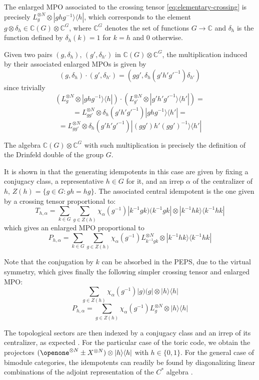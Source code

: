 \documentclass[rmp,aps,reprint,superscriptaddress,nobalancelastpage]{revtex4-1}
\def\Id{{\openone}}
\begin{document}
The enlarged MPO associated to the crossing tensor \eqref{eq:elementary-crossing} is precisely $L_g^{\otimes N}\otimes |ghg^{-1}\rangle\langle h|$, which corresponds to the element $g\otimes \delta_h \in \mathbb{C}(G)\otimes \mathbb{C}^G$, where $\mathbb{C}^G$ denotes the set of functions $G\rightarrow \mathbb{C}$ and $\delta_h$ is the function defined by $\delta_h(k)=1$ for $k=h$ and $0$ otherwise.

Given two pairs $(g,\delta_h)$, $(g',\delta_{h'})$ in $\mathbb{C}(G)\otimes \mathbb{C}^G$, the multiplication induced by their associated enlarged MPOs is given by
$$(g,\delta_h)\cdot(g',\delta_{h'})= (gg',\delta_{h}(g'h'g'^{-1})\delta_{h'} )$$
since trivially
$$\left(L_g^{\otimes N}\otimes |ghg^{-1}\rangle\langle h|\right)
    \cdot \left(L_{g'}^{\otimes N}\otimes |g'h'g'^{-1}\rangle\langle h'|\right)=
$$
$$=L_{gg'}^{\otimes N}\otimes \delta_{h}(g'h'g'^{-1}) |ghg^{-1}\rangle\langle h'|=$$
$$=L_{gg'}^{\otimes N}\otimes \delta_{h}(g'h'g'^{-1}) |(gg')h'(gg')^{-1}\rangle\langle h'|$$

The algebra $\mathbb{C}(G)\otimes \mathbb{C}^G$ with such multiplication is precisely the definition of the Drinfeld double of the group $G$.

It is shown in \cite{gould1993quantum} that the generating idempotents in this case are given by fixing a conjugacy class, a representative $h\in G$ for it, and an irrep $\alpha$ of the centralizer of $h$, $Z(h)=\{g\in G: gh=hg\}$.
The associated central idempotent is the one given by a crossing tensor proportional to:
$$T_{h,\alpha}= \sum_{k\in G}\sum_{g\in Z(h)} \chi_\alpha(g^{-1})|k^{-1}gk)(k^{-1}gk|\otimes |k^{-1}hk\rangle\langle k^{-1}hk| $$
which gives an enlarged MPO proportional to
$$P_{h,\alpha}=\sum_{k\in G}\sum_{g\in Z(h)} \chi_\alpha(g^{-1}) L_{k^{-1}gk}^{\otimes N}\otimes |k^{-1}hk\rangle\langle k^{-1}hk|$$

Note that the conjugation by $k$ can be absorbed in the PEPS, due to the virtual symmetry, which gives finally the following simpler crossing tensor and enlarged MPO:
$$\sum_{g\in Z(h)} \chi_\alpha(g^{-1})|g)(g|\otimes |h\rangle\langle h| $$
$$P_{h,\alpha}=\sum_{g\in Z(h)} \chi_\alpha(g^{-1}) L_g^{\otimes N}\otimes |h\rangle\langle h|$$


The topological sectors are then indexed by a conjugacy class and an irrep of its centralizer, as expected \cite{kitaev:toriccode}. For the particular case of the toric code, we obtain the projectors $(\Id^{\otimes N} \pm X^{\otimes N}) \otimes |h\rangle\langle h|$ with $h\in \{0,1\}$.
For the general case of bimodule categories, the idempotents can readily be found by diagonalizing linear combinations of the adjoint representation of the $C^*$ algebra \cite{lootens2020matrix}.
\end{document}
